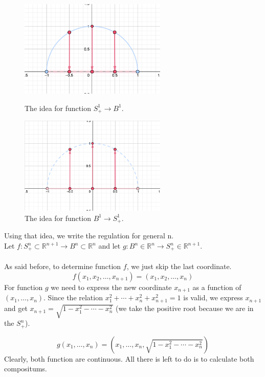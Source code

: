 \documentclass[a4paper,11pt]{article}
\begin{document}
\begin{figure}[ht]
    \begin{minipage}{0.5\textwidth}
         \centering
         \includegraphics[width=70mm]{XY_2.png}
         \caption{The idea for function $S_{+}^{1} \to B^1$.}
    \end{minipage}\hfill
    \begin{minipage}{0.5\textwidth}
         \centering
         \includegraphics[width=70mm]{YX_2.png}
         \caption{The idea for function $B^1 \to S_{+}^{1}$.}
    \end{minipage}\hfill
\end{figure}
\noindent
Using that idea, we write the regulation for general n.
\\
Let $f: S_{+}^{n} \subset \mathbb{R}^{n + 1} \to B^n \subset \mathbb{R}^n$ and let $g: B^n \in \mathbb{R}^n \to S_{+}^{n} \in \mathbb{R}^{n + 1}$. 
\\
\\
As said before, to determine function $f$, we just skip the last coordinate.
$$ f(x_1, x_2, \ldots, x_{n + 1}) = (x_1, x_2, \ldots, x_n) $$
For function $g$ we need to express the new coordinate $x_{n + 1}$ as a function of $(x_1, \ldots, x_n)$.
Since the relation $x_1^2 + \cdots + x_n^2 + x_{n + 1}^2 = 1$ is valid, we express $x_{n+1}$ and get $x_{n + 1} = \sqrt{ 1 - x_1^2 - \cdots - x_n^2}$ (we take the positive root because we are in the $S_{+}^{n}$). 

$$ g(x_1, \ldots, x_n) = \left( x_1, \ldots, x_n, \sqrt{ 1 - x_1^2 - \cdots - x_n^2} \right) $$
Clearly, both function are continuous. 
All there is left to do is to calculate both compositums.
\end{document}
